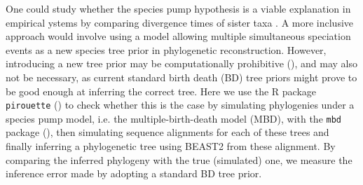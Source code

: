 One could study whether the species pump hypothesis is a viable explanation in empirical ystems by comparing divergence times of sister taxa . A more inclusive approach would involve using a model allowing multiple simultaneous speciation events as a new species tree prior in phylogenetic reconstruction. However, introducing a new tree prior may be computationally prohibitive (\citep{bilderbeek2019pirouette}), and may also not be necessary, as current standard birth death (BD) tree priors might prove to be good enough at inferring the correct tree. Here we use the R package \verb;pirouette; (\citep{pirouette}) to check whether this is the case by simulating phylogenies under a species pump model, i.e. the multiple-birth-death model (MBD), with the \verb;mbd; package (\citep{mbd}), then simulating sequence alignments for each of these trees and finally inferring a phylogenetic tree using BEAST2 from these alignment. By comparing the inferred phylogeny with the true (simulated) one, we measure the inference error made by adopting a standard BD tree prior.